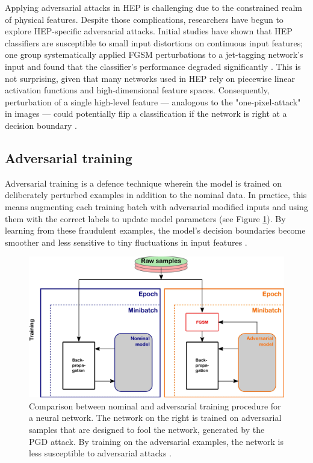 Applying adversarial attacks in HEP is challenging due to the constrained realm of physical features. Despite those complications, researchers have begun to explore HEP-specific adversarial attacks. Initial studies have shown that HEP classifiers are susceptible to small input distortions on continuous input features; one group systematically applied FGSM perturbations to a jet-tagging network's input and found that the classifier's performance degraded significantly \cite{Stein2022}. This is not surprising, given that many networks used in HEP rely on piecewise linear activation functions and high-dimensional feature spaces. Consequently, perturbation of a single high-level feature — analogous to the "one-pixel-attack" in images — could potentially flip a classification if the network is right at a decision boundary \cite{Stein2022}.

\subsection{Adversarial training}

Adversarial training is a defence technique wherein the model is trained on deliberately perturbed examples in addition to the nominal data. In practice, this means augmenting each training batch with adversarial modified inputs and using them with the correct labels to update model parameters (see Figure \ref{fig:adversarial_training}). By learning from these fraudulent examples, the model's decision boundaries become smoother and less sensitive to tiny fluctuations in input features \cite{goodfellow2015explainingharnessingadversarialexamples}.

\begin{figure}
    \centering
    \includegraphics[width=0.8\linewidth]{media/adversarial_training.png}
    \caption{Comparison between nominal and adversarial training procedure for a neural network. The network on the right is trained on adversarial samples that are designed to fool the network, generated by the PGD attack. By training on the adversarial examples, the network is less susceptible to adversarial attacks \cite{Stein2022}.}
    \label{fig:adversarial_training}
\end{figure}

